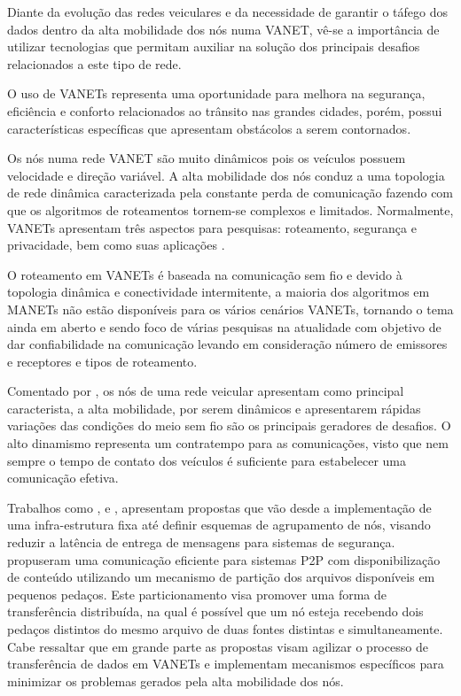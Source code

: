 \documentclass[
	12pt,				%
	oneside,			%
	a4paper,			%
	english,			%
	brazil				%
	]{abntex2ppgsi}
\begin{document}
Diante da evolução das redes veiculares e da necessidade de garantir o táfego dos dados dentro da alta mobilidade dos nós numa VANET, vê-se a importância de utilizar tecnologias que permitam auxiliar na solução dos principais desafios relacionados a este tipo de rede.  

O uso de VANETs representa uma oportunidade para melhora na segurança, eficiência e conforto relacionados ao trânsito nas grandes cidades, porém, possui características específicas que apresentam obstácolos a serem contornados. 

Os nós numa rede VANET são muito dinâmicos pois os veículos possuem velocidade e direção variável. A alta mobilidade dos nós conduz a uma topologia de rede dinâmica caracterizada pela constante perda de comunicação fazendo com que os algoritmos de roteamentos tornem-se complexos e limitados. Normalmente, VANETs apresentam três aspectos para pesquisas: roteamento, segurança e privacidade, bem como suas aplicações \cite{liang2015vehicular}.

O roteamento em VANETs é baseada na comunicação sem fio e devido à topologia dinâmica e conectividade intermitente, a maioria dos algoritmos em MANETs não estão disponíveis para os vários cenários VANETs, tornando o tema ainda em aberto  e sendo foco de várias pesquisas na atualidade com objetivo de dar confiabilidade na comunicação levando em consideração número de emissores e receptores e tipos de roteamento.

Comentado por , os nós de uma rede veicular apresentam como principal caracterista, a alta mobilidade, por serem dinâmicos e apresentarem rápidas variações das condições do meio sem fio são os principais geradores de desafios.  O alto dinamismo representa um contratempo para as comunicações, visto que nem sempre o tempo de contato dos veículos é suficiente para estabelecer uma comunicação efetiva.

Trabalhos como  ,  e , apresentam propostas que vão desde a implementação de uma infra-estrutura fixa até definir esquemas de agrupamento de nós, visando reduzir a latência de entrega de mensagens para sistemas de segurança.  propuseram uma comunicação eficiente para sistemas P2P com disponibilização de conteúdo utilizando um mecanismo de partição dos arquivos disponíveis em pequenos pedaços.  Este particionamento visa promover uma forma de transferência distribuída,  na qual é possível que um nó esteja recebendo dois pedaços distintos do mesmo arquivo de duas fontes distintas e simultaneamente.  Cabe ressaltar que em grande parte as propostas visam agilizar o processo de transferência de dados em VANETs e implementam mecanismos específicos para minimizar os problemas gerados pela alta mobilidade dos nós.
\end{document}
